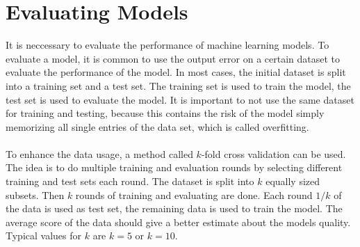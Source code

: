 \section{Evaluating Models}


It is neccessary to evaluate the performance of machine learning models. To evaluate a model, it is common to use the output error on a certain dataset to evaluate the performance of the model. In most cases, the initial dataset is split into a training set and a test set. The training set is used to train the model, the test set is used to evaluate the model. It is important to not use the same dataset for training and testing, because this contains the risk of the model simply memorizing all single entries of the data set, which is called overfitting. 
\\
\\
To enhance the data usage, a method called $k$-fold cross validation can be used. The idea is to do multiple training and evaluation rounds by selecting different training and test sets each round. The dataset is split into $k$ equally sized subsets. Then $k$ rounds of training and evaluating are done. Each round $1/k$ of the data is used as test set, the remaining data is used to train the model. The average score of the data should give a better estimate about the models quality. Typical values for $k$ are $k=5$ or $k=10$.
